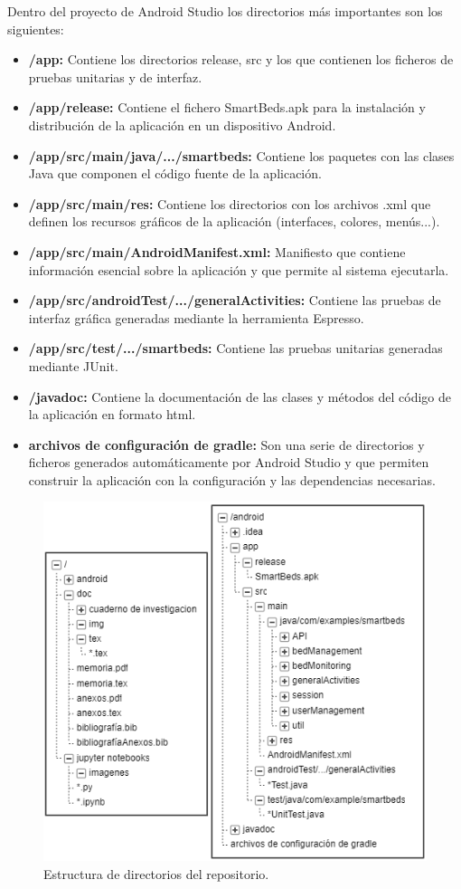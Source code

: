 Dentro del proyecto de Android Studio los directorios más importantes son los siguientes: 
\begin{itemize}
	\item \textbf{/app:} Contiene los directorios release, src y los que contienen los ficheros de pruebas unitarias y de interfaz. 
	\item \textbf{/app/release:} Contiene el fichero SmartBeds.apk para la instalación y distribución de la aplicación en un dispositivo Android. 
	\item \textbf{/app/src/main/java/.../smartbeds:} Contiene los paquetes con las clases Java que componen el código fuente de la aplicación. 
	\item \textbf{/app/src/main/res:} Contiene los directorios con los archivos .xml que definen los recursos gráficos de la aplicación (interfaces, colores, menús...). 
	\item \textbf{/app/src/main/AndroidManifest.xml:} Manifiesto que contiene información esencial sobre la aplicación y que permite al sistema ejecutarla. 
	\item \textbf{/app/src/androidTest/.../generalActivities:} Contiene las pruebas de interfaz gráfica generadas mediante la herramienta Espresso. 
	\item \textbf{/app/src/test/.../smartbeds:} Contiene las pruebas unitarias generadas mediante JUnit. 
	\item \textbf{/javadoc:} Contiene la documentación de las clases y métodos del código de la aplicación en formato html. 
	\item \textbf{archivos de configuración de gradle:} Son una serie de directorios y ficheros generados automáticamente por Android Studio y que permiten construir la aplicación con la configuración y las dependencias necesarias. 
\end{itemize}

\begin{figure}
	\centering
	\includegraphics[width=1\textwidth]{../img/directorios.png}
	\caption{Estructura de directorios del repositorio.}
	\label{fig:directorios}
\end{figure}


